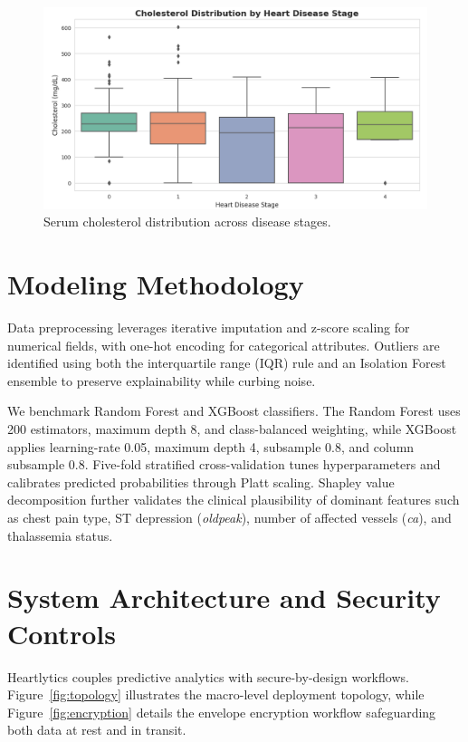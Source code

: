 \documentclass[12pt]{article}
\begin{document}
\begin{figure}[t]
  \centering
  \includegraphics[width=0.85\linewidth]{serum_cholesterol_across_disease_stages.png}
  \caption{Serum cholesterol distribution across disease stages.}
  \label{fig:chol}
\end{figure}

\section{Modeling Methodology}
Data preprocessing leverages iterative imputation and z-score scaling for numerical fields, with one-hot encoding for categorical attributes. Outliers are identified using both the interquartile range (IQR) rule and an Isolation Forest ensemble to preserve explainability while curbing noise.

We benchmark Random Forest and XGBoost classifiers. The Random Forest uses 200 estimators, maximum depth 8, and class-balanced weighting, while XGBoost applies learning-rate 0.05, maximum depth 4, subsample 0.8, and column subsample 0.8. Five-fold stratified cross-validation tunes hyperparameters and calibrates predicted probabilities through Platt scaling. Shapley value decomposition further validates the clinical plausibility of dominant features such as chest pain type, ST depression (\textit{oldpeak}), number of affected vessels (\textit{ca}), and thalassemia status.

\section{System Architecture and Security Controls}
Heartlytics couples predictive analytics with secure-by-design workflows. Figure~\ref{fig:topology} illustrates the macro-level deployment topology, while Figure~\ref{fig:encryption} details the envelope encryption workflow safeguarding both data at rest and in transit.
\end{document}
